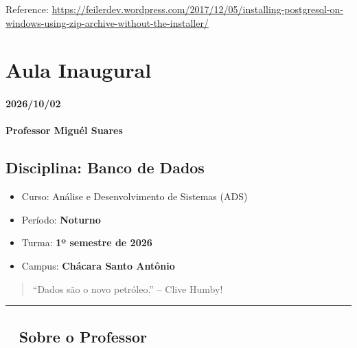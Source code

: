 \documentclass[
]{book}
\providecommand{\tightlist}{%
  \setlength{\itemsep}{0pt}\setlength{\parskip}{0pt}}
\begin{document}
Reference: \url{https://feilerdev.wordpress.com/2017/12/05/installing-postgresql-on-windows-using-zip-archive-without-the-installer/}

\chapter{\texorpdfstring{\textbf{Aula Inaugural}}{Aula Inaugural}}\label{aula-inaugural}

\subsubsection*{\texorpdfstring{\textbf{2026/10/02}}{2026/10/02}}\label{section}

\subsubsection*{\texorpdfstring{Professor \textbf{Miguél Suares}}{Professor Miguél Suares}}\label{professor-miguuxe9l-suares}

\section{\texorpdfstring{Disciplina: \textbf{Banco de Dados}}{Disciplina: Banco de Dados}}\label{disciplina-banco-de-dados}

\begin{itemize}
\tightlist
\item
  Curso: Análise e Desenvolvimento de Sistemas (ADS)
\item
  Período: \textbf{Noturno}
\item
  Turma: \textbf{1º semestre de 2026}
\item
  Campus: \textbf{Chácara Santo Antônio}
\end{itemize}

\begin{quote}
``Dados são o novo petróleo.'' -- Clive Humby!
\end{quote}

\begin{center}\rule{0.5\linewidth}{0.5pt}\end{center}

\section{👨‍🏫 Sobre o Professor}\label{sobre-o-professor}
\end{document}
